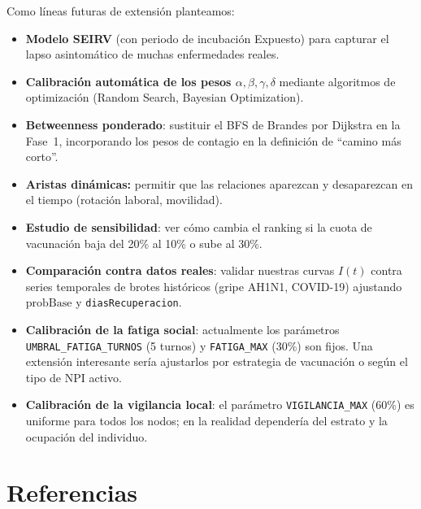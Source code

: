\documentclass[spanish,notitlepage,letterpaper, 12pt]{article}
\begin{document}
Como l\'ineas futuras de extensi\'on planteamos:
\begin{itemize}[leftmargin=*]
    \item \textbf{Modelo SEIRV} (con periodo de incubaci\'on Expuesto) para capturar el lapso asintom\'atico de muchas enfermedades reales.
    \item \textbf{Calibraci\'on autom\'atica de los pesos $\alpha, \beta, \gamma, \delta$} mediante algoritmos de optimizaci\'on (Random Search, Bayesian Optimization).
    \item \textbf{Betweenness ponderado}: sustituir el BFS de Brandes por Dijkstra en la Fase~1, incorporando los pesos de contagio en la definici\'on de ``camino m\'as corto''.
    \item \textbf{Aristas din\'amicas:} permitir que las relaciones aparezcan y desaparezcan en el tiempo (rotaci\'on laboral, movilidad).
    \item \textbf{Estudio de sensibilidad}: ver c\'omo cambia el ranking si la cuota de vacunaci\'on baja del 20\% al 10\% o sube al 30\%.
    \item \textbf{Comparaci\'on contra datos reales}: validar nuestras curvas $I(t)$ contra series temporales de brotes hist\'oricos (gripe AH1N1, COVID-19) ajustando $\text{probBase}$ y \texttt{diasRecuperacion}.
    \item \textbf{Calibraci\'on de la fatiga social}: actualmente los par\'ametros \texttt{UMBRAL\_FATIGA\_TURNOS} (5 turnos) y \texttt{FATIGA\_MAX} (30\%) son fijos. Una extensi\'on interesante ser\'ia ajustarlos por estrategia de vacunaci\'on o seg\'un el tipo de NPI activo.
    \item \textbf{Calibraci\'on de la vigilancia local}: el par\'ametro \texttt{VIGILANCIA\_MAX} (60\%) es uniforme para todos los nodos; en la realidad depender\'ia del estrato y la ocupaci\'on del individuo.
\end{itemize}

\newpage
\section*{Referencias}
\end{document}
